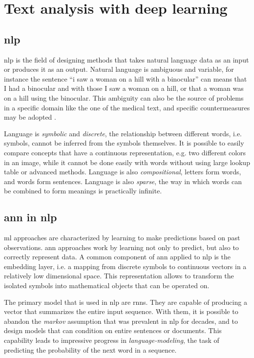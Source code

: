 \chapter{Text analysis with deep learning}

\section{\ac{nlp}}
\ac{nlp} is the field of designing methods that takes natural language
data as an input or
produces it as an output. Natural language is
ambiguous and variable, for instance the sentence ``i saw a woman on a
hill with a binocular'' can means that I had a binocular and with
those I saw a
woman on a hill, or that a woman was on a hill using the
binocular. This ambiguity can also be the source of problems in a
specific domain like the one of the medical text, and specific countermeasures
may be adopted \cite{zhao_clinical_2019,codish2005model}.

Language is
\emph{symbolic} and \emph{discrete}, the relationship between different words,
i.e. symbols, cannot be inferred from the symbols
themselves. It is possible to easily compare concepts that have a
continuous representation, e.g. two different colors in an image,
while it cannot be done easily with words without using large lookup
table or advanced methods. Language is also \emph{compositional},
letters form words, and words form sentences. Language is also
\emph{sparse}, the way in which words can be combined to form meanings
is practically infinite.

\section{\ac{ann} in \ac{nlp}}
\ac{ml} approaches are characterized by learning to make predictions
based on past observations. \ac{ann} approaches work by learning not
only to predict, but also to correctly represent data. A common
component of \ac{ann} applied to \ac{nlp} is the embedding layer,
i.e. a mapping from discrete symbols to continuous vectors in a
relatively low dimensional space. This representation allows to
transform the isolated symbols into mathematical objects that can be
operated on.

The primary model that is used in \ac{nlp} are \acp{rnn}. They are
capable of producing a vector that summarizes the entire input
sequence. With them, it is possible to abandon the \emph{markov} assumption that was
prevalent in \ac{nlp} for decades, and to design models that can
condition on entire sentences or documents. This capability leads to
impressive progress in \emph{language-modeling}, the task of predicting
the probability of the next word in a sequence.

